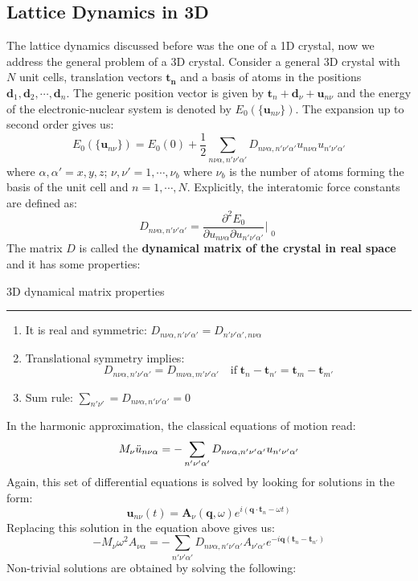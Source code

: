 \documentclass[10.75pt,a4paper,openright,bottom=2cm]{article}
\renewcommand{\Vec}[1]{\boldsymbol{#1}}
\begin{document}
\subsection{Lattice Dynamics in 3D}
The lattice dynamics discussed before was the one of a 1D crystal, now we address the general problem of a 3D crystal. Consider a general 3D crystal with $N$ unit cells, translation vectors $\Vec{t_n}$ and a basis of atoms in the positions $\Vec{d}_1,\Vec{d}_2,\cdots,\Vec{d}_n$. The generic position vector is given by $\Vec{t}_n+\Vec{d}_\nu+\Vec{u}_{n\nu}$ and the energy of the electronic-nuclear system is denoted by $E_0(\{\Vec{u}_{n\nu}\})$. The expansion up to second order gives us:
\[
E_0(\{\Vec{u}_{n\nu}\})=E_0(0)+\frac{1}{2}\sum_{n\nu\alpha,n'\nu'\alpha'}D_{n\nu\alpha,n'\nu'\alpha'}u_{n\nu\alpha}u_{n'\nu'\alpha'}
\]
where $\alpha,\alpha'=x,y,z$; $\nu,\nu'=1,\cdots,\nu_b$ where $\nu_b$ is the number of atoms forming the basis of the unit cell and $n=1,\cdots,N$. Explicitly, the interatomic force constants are defined as:
\[
D_{n\nu\alpha,n'\nu'\alpha'}=\frac{\partial^2E_0}{\partial u_{n\nu\alpha}\partial u_{n'\nu'\alpha'}}\Bigr|_{\substack{0}}
\]
The matrix $D$ is called the \textbf{dynamical matrix of the crystal in real space} and it has some properties:
\begin{mybox}
3D dynamical matrix properties
\hrule
\begin{enumerate}\renewcommand{\labelenumi}{\arabic{enumi})}
    \item It is real and symmetric: $D_{n\nu\alpha,n'\nu'\alpha'}=D_{n'\nu'\alpha',n\nu\alpha}$
    \item Translational symmetry implies: 
    \[
    D_{n\nu\alpha,n'\nu'\alpha'}=D_{m\nu\alpha,m'\nu'\alpha'} \quad\text{if}\; \Vec{t}_n-\Vec{t}_{n'}=\Vec{t}_m-\Vec{t}_{m'}
    \]
    \item Sum rule: $\sum_{n'\nu'}=D_{n\nu\alpha,n'\nu'\alpha'}=0$
\end{enumerate}
\end{mybox}
\noindent
In the harmonic approximation, the classical equations of motion read:
\[
M_\nu\Ddot{u}_{n\nu\alpha}=-\sum_{n'\nu'\alpha'}D_{n\nu\alpha,n'\nu'\alpha'}u_{n'\nu'\alpha'}
\]
Again, this set of differential equations is solved by looking for solutions in the form:
\[
\Vec{u}_{n\nu}(t)=\Vec{A}_\nu(\Vec{q},\omega)e^{i(\Vec{q}\cdot\Vec{t}_n-\omega t)}
\]
Replacing this solution in the equation above gives us:
\[
-M_\nu\omega^2A_{\nu\alpha}=-\sum_{n'\nu'\alpha'}D_{n\nu\alpha,n'\nu'\alpha'}A_{\nu'\alpha'}e^{-i\Vec{q}(\Vec{t}_n-\Vec{t}_{n'})}
\]
Non-trivial solutions are obtained by solving the following:
\end{document}
